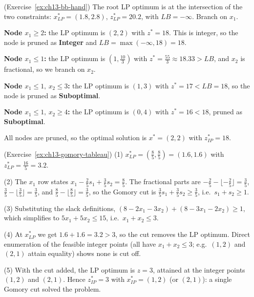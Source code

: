\begin{solution}(Exercise~\ref{ex:ch13-bb-hand})
The root LP optimum is at the intersection of the two constraints:
$x^*_{LP} = (1.8, 2.8)$, $z^*_{LP} = 20.2$, with $LB = -\infty$.  Branch on
$x_1$.

\textbf{Node $x_1 \geq 2$:} the LP optimum is $(2, 2)$ with $z^* = 18$.
This is integer, so the node is pruned as \textbf{Integer} and
$LB = \max(-\infty, 18) = 18$.

\textbf{Node $x_1 \leq 1$:} the LP optimum is $(1, \tfrac{10}{3})$ with
$z^* = \tfrac{55}{3} \approx 18.33 > LB$, and $x_2$ is fractional, so we
branch on $x_2$.

\textbf{Node $x_1 \leq 1,\ x_2 \leq 3$:} the LP optimum is $(1, 3)$ with
$z^* = 17 < LB = 18$, so the node is pruned as \textbf{Suboptimal}.

\textbf{Node $x_1 \leq 1,\ x_2 \geq 4$:} the LP optimum is $(0, 4)$ with
$z^* = 16 < 18$, pruned as \textbf{Suboptimal}.

All nodes are pruned, so the optimal solution is $x^* = (2, 2)$ with
$z^*_{IP} = 18$.
\end{solution}

\begin{solution}(Exercise~\ref{ex:ch13-gomory-tableau})
(1) $x^*_{LP} = (\tfrac85, \tfrac85) = (1.6, 1.6)$ with
$z^*_{LP} = \tfrac{16}{5} = 3.2$.

(2) The $x_1$ row states $x_1 - \tfrac25 s_1 + \tfrac35 s_2 = \tfrac85$.
The fractional parts are $-\tfrac25 - \lfloor -\tfrac25 \rfloor = \tfrac35$,
$\tfrac35 - \lfloor \tfrac35 \rfloor = \tfrac35$, and
$\tfrac85 - \lfloor \tfrac85 \rfloor = \tfrac35$, so the Gomory cut is
$\tfrac35 s_1 + \tfrac35 s_2 \geq \tfrac35$, i.e.\ $s_1 + s_2 \geq 1$.

(3) Substituting the slack definitions,
$(8 - 2x_1 - 3x_2) + (8 - 3x_1 - 2x_2) \geq 1$, which simplifies to
$5x_1 + 5x_2 \leq 15$, i.e.\ $x_1 + x_2 \leq 3$.

(4) At $x^*_{LP}$ we get $1.6 + 1.6 = 3.2 > 3$, so the cut removes the LP
optimum.  Direct enumeration of the feasible integer points (all have
$x_1 + x_2 \leq 3$; e.g.\ $(1,2)$ and $(2,1)$ attain equality) shows none is
cut off.

(5) With the cut added, the LP optimum is $z = 3$, attained at the integer
points $(1,2)$ and $(2,1)$.  Hence $z^*_{IP} = 3$ with
$x^*_{IP} = (1,2)$ (or $(2,1)$): a single Gomory cut solved the problem.
\end{solution}

